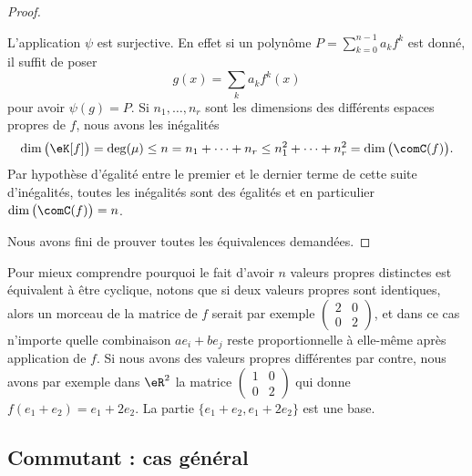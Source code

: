 \begin{proof}
\begin{subproof}
		L'application \( \psi\) est surjective. En effet si un polynôme \( P=\sum_{k=0}^{n-1}a_kf^k\) est donné, il suffit de poser
		\begin{equation}
			g(x)=\sum_ka_kf^k(x)
		\end{equation}
		pour avoir \( \psi(g)=P \).
		Si \( n_1,\ldots, n_r\) sont les dimensions des différents espaces propres de \( f\), nous avons les inégalités
		\begin{equation}
			\dim\big( \eK[f] \big)=\deg(\mu)\leq n=n_1+\cdots +n_r\leq n_1^2+\cdots +n_r^2=\dim\big( \comC(f) \big).
		\end{equation}
		Par hypothèse d'égalité entre le premier et le dernier terme de cette suite d'inégalités, toutes les inégalités sont des égalités et en particulier \( \dim\big( \comC(f) \big)=n\).
	\end{subproof}
	Nous avons fini de prouver toutes les équivalences demandées.
\end{proof}

\begin{example}
	Pour mieux comprendre pourquoi le fait d'avoir \( n\) valeurs propres distinctes est équivalent à être cyclique, notons que si deux valeurs propres sont identiques, alors un morceau de la matrice de \( f\) serait par exemple \( \begin{pmatrix}
		2 & 0 \\
		0 & 2
	\end{pmatrix}\), et dans ce cas n'importe quelle combinaison \( ae_i+be_j\) reste proportionnelle à elle-même après application de \( f\). Si nous avons des valeurs propres différentes par contre, nous avons par exemple dans \( \eR^2\) la matrice \( \begin{pmatrix}
		1 & 0 \\
		0 & 2
	\end{pmatrix}\) qui donne \( f(e_1+e_2)=e_1+2e_2\). La partie \( \{ e_1+e_2,e_1+2e_2 \}\) est une base.
\end{example}

\subsection{Commutant : cas général}


